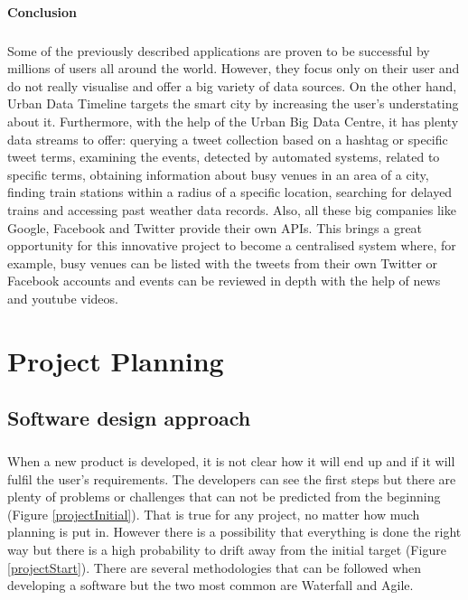 \documentclass{l4proj}
\begin{document}
\subsubsection{Conclusion}
\paragraph{}
Some of the previously described applications are proven to be successful by millions of users all around the world. However, they focus only on their user and do not really visualise and offer a big variety of data sources. On the other hand, Urban Data Timeline targets the smart city by increasing the user's understating about it. Furthermore, with the help of the Urban Big Data Centre, it has plenty data streams to offer: querying a tweet collection based on a hashtag or specific tweet terms, examining the events, detected by automated systems, related to specific terms, obtaining information about busy venues in an area of a city, finding train stations within a radius of a specific location, searching for delayed trains and accessing past weather data records. Also, all these big companies like Google, Facebook and Twitter provide their own APIs. This brings a great opportunity for this innovative project to become a centralised system where, for example, busy venues can be listed with the tweets from their own Twitter or Facebook accounts and events can be reviewed in depth with the help of news and youtube videos.


\chapter{Project Planning}

\section{Software design approach}
\paragraph{}
When a new product is developed, it is not clear how it will end up and if it will fulfil the user's requirements. The developers can see the first steps but there are plenty of problems or challenges that can not be predicted from the beginning (Figure \ref{projectInitial}). That is true for any project, no matter how much planning is put in. However there is a possibility that everything is done the right way but there is a high probability to drift away from the initial target (Figure \ref{projectStart}). There are several methodologies that can be followed when developing a software but the two most common are Waterfall and Agile. 
\end{document}
